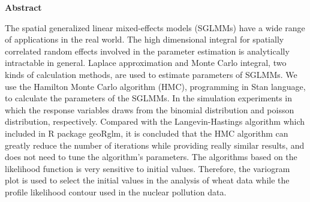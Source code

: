 \begin{center}
{\bf \Large Abstract}\\
\vskip 0.6cm
\end{center}
\par

The spatial generalized linear mixed-effects models (SGLMMs) have a wide range of applications in the real world. The high dimensional integral for spatially correlated random effects involved in the parameter estimation is analytically intractable in general. Laplace approximation and Monte Carlo integral, two kinds of calculation methods, are used to estimate parameters of SGLMMs. We use the Hamilton Monte Carlo algorithm (HMC), programming in Stan language, to calculate the parameters of the SGLMMs. In the simulation experiments in which the response variables draws from the binomial distribution and poisson distribution, respectively. Compared with the Langevin-Hastings algorithm which included in R package geoRglm, it is concluded that the HMC algorithm can greatly reduce the number of iterations while providing really similar results, and does not need to tune the algorithm's parameters. The algorithms based on the likelihood function is very sensitive to initial values. Therefore, the variogram plot is used to select the initial values in the analysis of wheat data while the profile likelihood contour used in the nuclear pollution data.



%  



